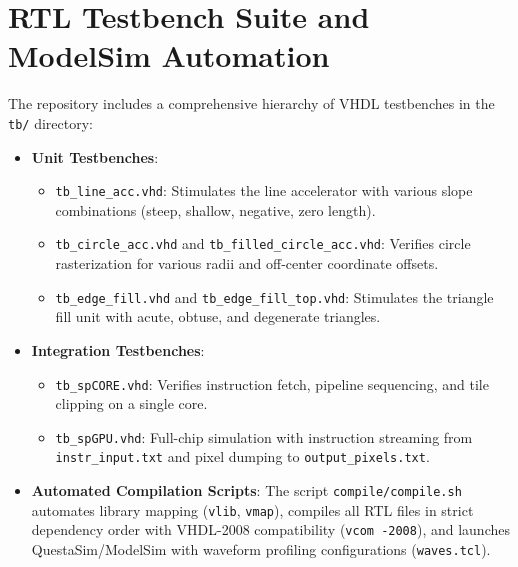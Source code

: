 \section{RTL Testbench Suite and ModelSim Automation}
The repository includes a comprehensive hierarchy of VHDL testbenches in the \texttt{tb/} directory:
\begin{itemize}
    \item \textbf{Unit Testbenches}:
    \begin{itemize}
        \item \texttt{tb\_line\_acc.vhd}: Stimulates the line accelerator with various slope combinations (steep, shallow, negative, zero length).
        \item \texttt{tb\_circle\_acc.vhd} and \texttt{tb\_filled\_circle\_acc.vhd}: Verifies circle rasterization for various radii and off-center coordinate offsets.
        \item \texttt{tb\_edge\_fill.vhd} and \texttt{tb\_edge\_fill\_top.vhd}: Stimulates the triangle fill unit with acute, obtuse, and degenerate triangles.
    \end{itemize}
    \item \textbf{Integration Testbenches}:
    \begin{itemize}
        \item \texttt{tb\_spCORE.vhd}: Verifies instruction fetch, pipeline sequencing, and tile clipping on a single core.
        \item \texttt{tb\_spGPU.vhd}: Full-chip simulation with instruction streaming from \texttt{instr\_input.txt} and pixel dumping to \texttt{output\_pixels.txt}.
    \end{itemize}
    \item \textbf{Automated Compilation Scripts}: The script \texttt{compile/compile.sh} automates library mapping (\texttt{vlib}, \texttt{vmap}), compiles all RTL files in strict dependency order with VHDL-2008 compatibility (\texttt{vcom -2008}), and launches QuestaSim/ModelSim with waveform profiling configurations (\texttt{waves.tcl}).
\end{itemize}
